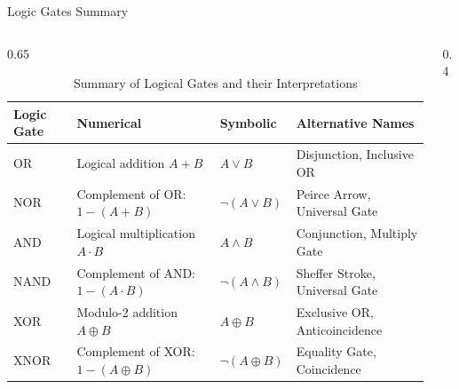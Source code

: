 \begin{frame}{Logic Gates Summary}
\begin{columns}
\begin{column}{0.65\textwidth}
\renewcommand{\arraystretch}{1.2} %
\setlength{\tabcolsep}{3pt} %
\begin{table}
\raggedright
\scriptsize %
\begin{tabular}{|>{\centering\arraybackslash}p{1.5cm}|>{\centering\arraybackslash}p{2.2cm}|>{\centering\arraybackslash}p{1.2cm}|>{\centering\arraybackslash}p{3cm}|}
\hline
\textbf{Logic Gate} & \textbf{Numerical} & \textbf{Symbolic} & \textbf{Alternative Names} \\ \hline

OR  & Logical addition \( A + B \) & \( A \lor B \) & Disjunction, Inclusive OR \\ \hline

NOR  & Complement of OR: \( 1 - (A + B) \) & \( \neg (A \lor B) \) & Peirce Arrow, Universal Gate \\ \hline

AND & Logical multiplication \( A \cdot B \) & \( A \land B \) & Conjunction, Multiply Gate \\ \hline

NAND  & Complement of AND: \( 1 - (A \cdot B) \) & \( \neg (A \land B) \) & Sheffer Stroke, Universal Gate \\ \hline

XOR  & Modulo-2 addition \( A \oplus B \) & \( A \oplus B \) & Exclusive OR, Anticoincidence \\ \hline

XNOR  & Complement of XOR: \( 1 - (A \oplus B) \) & \( \neg (A \oplus B) \) & Equality Gate, Coincidence \\ \hline

\end{tabular}
\caption{Summary of Logical Gates and their Interpretations}
\end{table}
\end{column}
\begin{column}{0.4\textwidth}
\scalebox{0.8}{}
\end{column}
\end{columns}
\end{frame}

